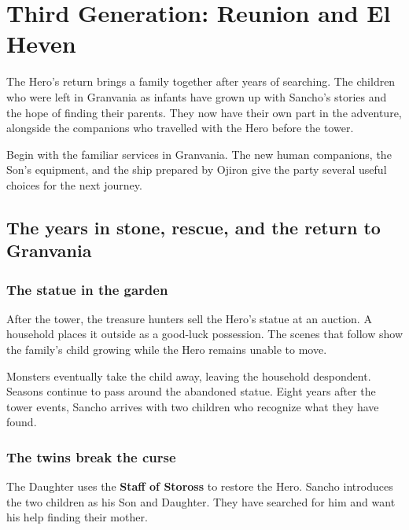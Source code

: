 \chapter{Third Generation: Reunion and El Heven}
\label{written-reunion}

The Hero's return brings a family together after years of searching.
The children who were left in Granvania as infants have grown up with
Sancho's stories and the hope of finding their parents. They now have
their own part in the adventure, alongside the companions who travelled
with the Hero before the tower.

Begin with the familiar services in Granvania. The new human companions,
the Son's equipment, and the ship prepared by Ojiron give the party
several useful choices for the next journey.

\section{The years in stone, rescue, and the return to Granvania}

\subsection*{The statue in the garden}

After the tower, the treasure hunters sell the Hero's statue at an
auction. A household places it outside as a good-luck possession.
The scenes that follow show the family's child growing while the Hero
remains unable to move.

Monsters eventually take the child away, leaving the household
despondent. Seasons continue to pass around the abandoned statue.
Eight years after the tower events, Sancho arrives with two children
who recognize what they have found.

\subsection*{The twins break the curse}

The Daughter uses the \textbf{Staff of Stoross} to restore the
Hero. Sancho introduces the two children as his Son and Daughter.
They have searched for him and want his help finding their mother.



